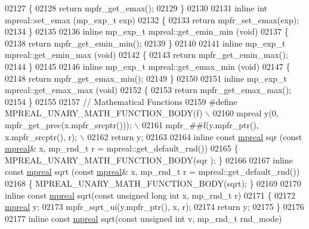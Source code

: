 \begin{DoxyCode}
{{02127 \{
02128     \textcolor{keywordflow}{return} mpfr\_get\_emax();
02129 \}
02130 
02131 \textcolor{keyword}{inline} \textcolor{keywordtype}{int} mpreal::set\_emax (mp\_exp\_t exp)
02132 \{
02133     \textcolor{keywordflow}{return} mpfr\_set\_emax(exp);
02134 \}
02135 
02136 \textcolor{keyword}{inline} mp\_exp\_t mpreal::get\_emin\_min (\textcolor{keywordtype}{void})
02137 \{
02138     \textcolor{keywordflow}{return} mpfr\_get\_emin\_min();
02139 \}
02140 
02141 \textcolor{keyword}{inline} mp\_exp\_t mpreal::get\_emin\_max (\textcolor{keywordtype}{void})
02142 \{
02143     \textcolor{keywordflow}{return} mpfr\_get\_emin\_max();
02144 \}
02145 
02146 \textcolor{keyword}{inline} mp\_exp\_t mpreal::get\_emax\_min (\textcolor{keywordtype}{void})
02147 \{
02148     \textcolor{keywordflow}{return} mpfr\_get\_emax\_min();
02149 \}
02150 
02151 \textcolor{keyword}{inline} mp\_exp\_t mpreal::get\_emax\_max (\textcolor{keywordtype}{void})
02152 \{
02153     \textcolor{keywordflow}{return} mpfr\_get\_emax\_max();
02154 \}
02155 
02157 \textcolor{comment}{// Mathematical Functions}
02159 \textcolor{comment}{}\textcolor{preprocessor}{#define MPREAL\_UNARY\_MATH\_FUNCTION\_BODY(f)                    \(\backslash\)}
02160 \textcolor{preprocessor}{        mpreal y(0, mpfr\_get\_prec(x.mpfr\_srcptr()));          \(\backslash\)}
02161 \textcolor{preprocessor}{        mpfr\_##f(y.mpfr\_ptr(), x.mpfr\_srcptr(), r);           \(\backslash\)}
02162 \textcolor{preprocessor}{        return y;}
02163 
02164 \textcolor{keyword}{inline} \textcolor{keyword}{const} \hyperlink{classmpfr_1_1mpreal}{mpreal} sqr  (\textcolor{keyword}{const} \hyperlink{classmpfr_1_1mpreal}{mpreal}& x, mp\_rnd\_t r = mpreal::get\_default\_rnd())
02165 \{   MPREAL\_UNARY\_MATH\_FUNCTION\_BODY(sqr );    \}
02166 
02167 \textcolor{keyword}{inline} \textcolor{keyword}{const} \hyperlink{classmpfr_1_1mpreal}{mpreal} sqrt (\textcolor{keyword}{const} \hyperlink{classmpfr_1_1mpreal}{mpreal}& x, mp\_rnd\_t r = mpreal::get\_default\_rnd())
02168 \{   MPREAL\_UNARY\_MATH\_FUNCTION\_BODY(sqrt);    \}
02169 
02170 \textcolor{keyword}{inline} \textcolor{keyword}{const} \hyperlink{classmpfr_1_1mpreal}{mpreal} sqrt(\textcolor{keyword}{const} \textcolor{keywordtype}{unsigned} \textcolor{keywordtype}{long} \textcolor{keywordtype}{int} x, mp\_rnd\_t r)
02171 \{
02172     \hyperlink{classmpfr_1_1mpreal}{mpreal} y;
02173     mpfr\_sqrt\_ui(y.mpfr\_ptr(), x, r);
02174     \textcolor{keywordflow}{return} y;
02175 \}
02176 
02177 \textcolor{keyword}{inline} \textcolor{keyword}{const} \hyperlink{classmpfr_1_1mpreal}{mpreal} sqrt(\textcolor{keyword}{const} \textcolor{keywordtype}{unsigned} \textcolor{keywordtype}{int} v, mp\_rnd\_t rnd\_mode)
}}
\end{DoxyCode}
